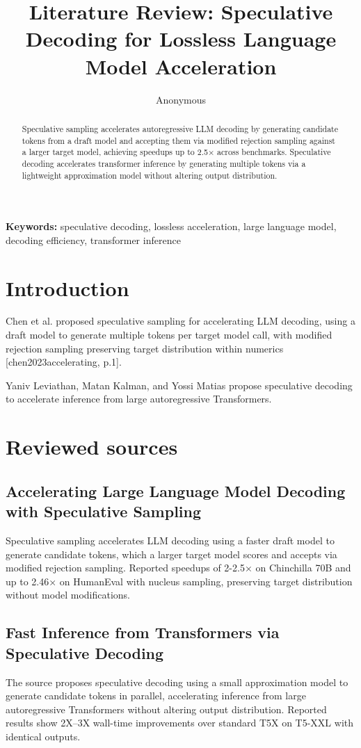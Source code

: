 \documentclass{article}\usepackage{amsmath,amssymb,graphicx,url}
\title{Literature Review: Speculative Decoding for Lossless Language Model Acceleration}
\author{Anonymous}
\begin{document}
\maketitle
\begin{abstract}
Speculative sampling accelerates autoregressive LLM decoding by generating candidate tokens from a draft model and accepting them via modified rejection sampling against a larger target model, achieving speedups up to 2.5× across benchmarks. \cite{chen2023accelerating} Speculative decoding accelerates transformer inference by generating multiple tokens via a lightweight approximation model without altering output distribution. \cite{leviathan2022fast}
\end{abstract}
\noindent\textbf{Keywords:} speculative decoding, lossless acceleration, large language model, decoding efficiency, transformer inference




\section{Introduction}
Chen et al. proposed speculative sampling for accelerating LLM decoding, using a draft model to generate multiple tokens per target model call, with modified rejection sampling preserving target distribution within numerics [chen2023accelerating, p.1]. \cite{chen2023accelerating}

Yaniv Leviathan, Matan Kalman, and Yossi Matias propose speculative decoding to accelerate inference from large autoregressive Transformers. \cite{leviathan2022fast}

\section{Reviewed sources}
\subsection{Accelerating Large Language Model Decoding with Speculative Sampling}
Speculative sampling accelerates LLM decoding using a faster draft model to generate candidate tokens, which a larger target model scores and accepts via modified rejection sampling. Reported speedups of 2-2.5× on Chinchilla 70B and up to 2.46× on HumanEval with nucleus sampling, preserving target distribution without model modifications. \cite{chen2023accelerating}

\subsection{Fast Inference from Transformers via Speculative Decoding}
The source proposes speculative decoding using a small approximation model to generate candidate tokens in parallel, accelerating inference from large autoregressive Transformers without altering output distribution. Reported results show 2X–3X wall-time improvements over standard T5X on T5-XXL with identical outputs. \cite{leviathan2022fast}
\end{document}
